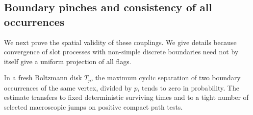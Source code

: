 \subsection{Boundary pinches and consistency of all occurrences}\label{cut:occurrences}

We next prove the spatial validity of these couplings. We give details because convergence of slot processes with non-simple discrete boundaries need not by itself give a uniform projection of all flags.

\begin{lemma}\label{cut:fresh-pinch}
In a fresh Boltzmann disk \(T_p\), the maximum cyclic separation of two
boundary occurrences of the same vertex, divided by \(p\), tends to zero in
probability.  The estimate transfers to fixed deterministic surviving times
and to a tight number of selected macroscopic jumps on positive compact
path tests.
\end{lemma}
